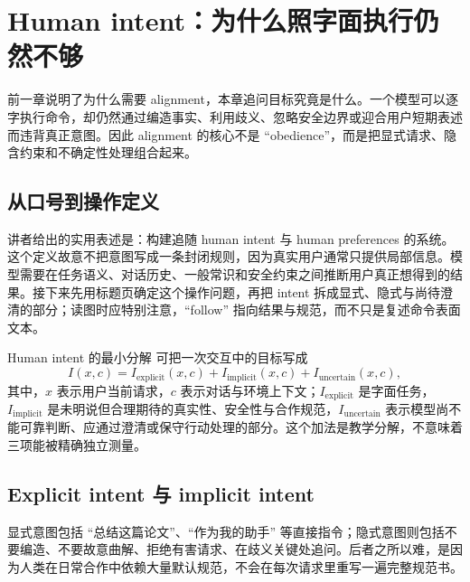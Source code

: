 \section{Human intent：为什么照字面执行仍然不够}

前一章说明了为什么需要 alignment，本章追问目标究竟是什么。一个模型可以逐字执行命令，却仍然通过编造事实、利用歧义、忽略安全边界或迎合用户短期表述而违背真正意图。因此 alignment 的核心不是 ``obedience''，而是把显式请求、隐含约束和不确定性处理组合起来。

\subsection{从口号到操作定义}

讲者给出的实用表述是：构建追随 human intent 与 human preferences 的系统。这个定义故意不把意图写成一条封闭规则，因为真实用户通常只提供局部信息。模型需要在任务语义、对话历史、一般常识和安全约束之间推断用户真正想得到的结果。接下来先用标题页确定这个操作问题，再把 intent 拆成显式、隐式与尚待澄清的部分；读图时应特别注意，``follow'' 指向结果与规范，而不只是复述命令表面文本。


\begin{importantbox}{Human intent 的最小分解}
可把一次交互中的目标写成
\[
I(x,c)=I_{\mathrm{explicit}}(x,c)+I_{\mathrm{implicit}}(x,c)+I_{\mathrm{uncertain}}(x,c),
\]
其中，$x$ 表示用户当前请求，$c$ 表示对话与环境上下文；$I_{\mathrm{explicit}}$ 是字面任务，$I_{\mathrm{implicit}}$ 是未明说但合理期待的真实性、安全性与合作规范，$I_{\mathrm{uncertain}}$ 表示模型尚不能可靠判断、应通过澄清或保守行动处理的部分。这个加法是教学分解，不意味着三项能被精确独立测量。
\end{importantbox}

\subsection{Explicit intent 与 implicit intent}

显式意图包括 ``总结这篇论文''、``作为我的助手'' 等直接指令；隐式意图则包括不要编造、不要故意曲解、拒绝有害请求、在歧义关键处追问。后者之所以难，是因为人类在日常合作中依赖大量默认规范，不会在每次请求里重写一遍完整规范书。


